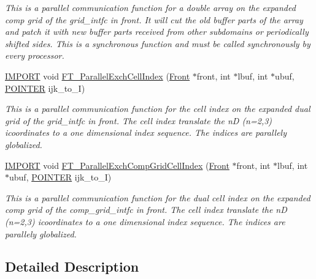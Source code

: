 \begin{DoxyCompactItemize}
\begin{DoxyCompactList}\small\item\em This is a parallel communication function for a double array on the expanded comp grid of the grid\+\_\+intfc in front. It will cut the old buffer parts of the array and patch it with new buffer parts received from other subdomains or periodically shifted sides. This is a synchronous function and must be called synchronously by every processor. \end{DoxyCompactList}\item 
\hyperlink{cdecs_8h_a773175d74e73776d69c3e538f17de1ee}{I\+M\+P\+O\+RT} void \hyperlink{group___p_a_r_a_l_l_e_l_ga5e302e94034858bbc5e3925afb2e1cb2}{F\+T\+\_\+\+Parallel\+Exch\+Cell\+Index} (\hyperlink{fdecs_8h_ac32202b798f848095c489cfd04c4ca5f}{Front} $\ast$front, int $\ast$lbuf, int $\ast$ubuf, \hyperlink{cdecs_8h_ae51a81000f343b8ec43bca1f6a723d7b}{P\+O\+I\+N\+T\+ER} ijk\+\_\+to\+\_\+I)
\begin{DoxyCompactList}\small\item\em This is a parallel communication function for the cell index on the expanded dual grid of the grid\+\_\+intfc in front. The cell index translate the nD (n=2,3) icoordinates to a one dimensional index sequence. The indices are parallely globalized. \end{DoxyCompactList}\item 
\hyperlink{cdecs_8h_a773175d74e73776d69c3e538f17de1ee}{I\+M\+P\+O\+RT} void \hyperlink{group___p_a_r_a_l_l_e_l_ga2efb6c1cae43876327c0f8dfc35c4839}{F\+T\+\_\+\+Parallel\+Exch\+Comp\+Grid\+Cell\+Index} (\hyperlink{fdecs_8h_ac32202b798f848095c489cfd04c4ca5f}{Front} $\ast$front, int $\ast$lbuf, int $\ast$ubuf, \hyperlink{cdecs_8h_ae51a81000f343b8ec43bca1f6a723d7b}{P\+O\+I\+N\+T\+ER} ijk\+\_\+to\+\_\+I)
\begin{DoxyCompactList}\small\item\em This is a parallel communication function for the dual cell index on the expanded comp grid of the comp\+\_\+grid\+\_\+intfc in front. The cell index translate the nD (n=2,3) icoordinates to a one dimensional index sequence. The indices are parallely globalized. \end{DoxyCompactList}\end{DoxyCompactItemize}


\subsection{Detailed Description}


